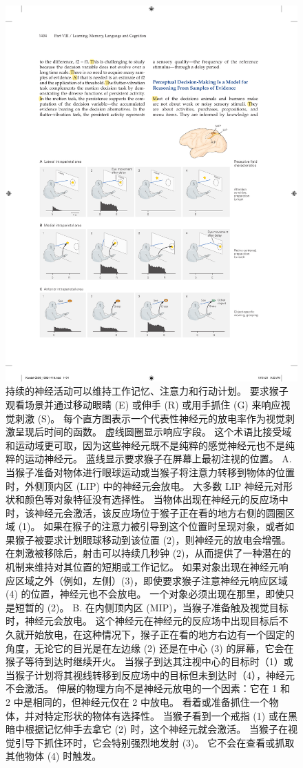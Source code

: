 \begin{figure}[htbp]
	\centering
	\includegraphics[width=0.95\linewidth]{chap56/fig_56_7}
	\caption{持续的神经活动可以维持工作记忆、注意力和行动计划。 要求猴子观看场景并通过移动眼睛 (E) 或伸手 (R) 或用手抓住 (G) 来响应视觉刺激 (S)。 每个直方图表示一个代表性神经元的放电率作为视觉刺激呈现后时间的函数。 虚线圆圈显示响应字段。 这个术语比接受域和运动域更可取，因为这些神经元既不是纯粹的感觉神经元也不是纯粹的运动神经元。 蓝线显示要求猴子在屏幕上最初注视的位置。 A. 当猴子准备对物体进行眼球运动或当猴子将注意力转移到物体的位置时，外侧顶内区 (LIP) 中的神经元会放电。 大多数 LIP 神经元对形状和颜色等对象特征没有选择性。 当物体出现在神经元的反应场中时，该神经元会激活，该反应场位于猴子正在看的地方右侧的圆圈区域 (1)。 如果在猴子的注意力被引导到这个位置时呈现对象，或者如果猴子被要求计划眼球移动到该位置 (2)，则神经元的放电会增强。 在刺激被移除后，射击可以持续几秒钟 (2)，从而提供了一种潜在的机制来维持对其位置的短期或工作记忆。 如果对象出现在神经元响应区域之外（例如，左侧）(3)，即使要求猴子注意神经元响应区域 (4) 的位置，神经元也不会放电。 一个对象必须出现在那里，即使只是短暂的 (2)。 B. 在内侧顶内区 (MIP)，当猴子准备触及视觉目标时，神经元会放电。 这个神经元在神经元的反应场中出现目标后不久就开始放电，在这种情况下，猴子正在看的地方右边有一个固定的角度，无论它的目光是在左边缘 (2) 还是在中心 (3) 的屏幕，它会在猴子等待到达时继续开火。 当猴子到达其注视中心的目标时（1）或当猴子计划将其视线转移到反应场中的目标但未到达时（4），神经元不会激活。 伸展的物理方向不是神经元放电的一个因素：它在 1 和 2 中是相同的，但神经元仅在 2 中放电。 看着或准备抓住一个物体，并对特定形状的物体有选择性。 当猴子看到一个戒指 (1) 或在黑暗中根据记忆伸手去拿它 (2) 时，这个神经元就会激活。 当猴子在视觉引导下抓住环时，它会特别强烈地发射 (3)。 它不会在查看或抓取其他物体 (4) 时触发。}
	\label{fig:56_7}
\end{figure}



